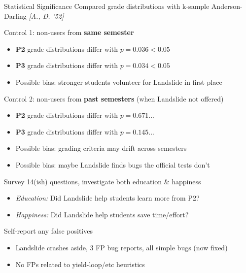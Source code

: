 \documentclass[xcolor=dvipsnames]{beamer}
\begin{document}
\begin{frame}{Statistical Significance}
	Compared %
	grade distributions with k-sample Anderson-Darling {\em [A., D. '52]}
	\linegap

	Control 1: non-users from {\bf same semester}
	\begin{itemize}
		\item {\bf P2} grade distributions differ with $p = 0.036 < 0.05$
		\item {\bf P3} grade distributions differ with $p = 0.034 < 0.05$
			\pause
		\item Possible bias: stronger students volunteer for Landslide in first place
	\end{itemize}
	\pause
	\linegap

	Control 2: non-users from {\bf past semesters} (when Landslide not offered)
	\begin{itemize}
		\item {\bf P2} grade distributions differ with $p = 0.671$...
		\item {\bf P3} grade distributions differ with $p = 0.145$...
			\pause
		\item Possible bias: grading criteria may drift across semesters
		\item Possible bias: maybe Landslide finds bugs the official tests don't
	\end{itemize}
\end{frame}

\begin{frame}{Survey}
	14(ish) questions, investigate both education \& happiness
	\begin{itemize}
		\item {\em Education:} Did Landslide help students learn more from P2?
		\item {\em Happiness:} Did Landslide help students save time/effort?
	\end{itemize}
	\linegap

	Self-report any false positives
	\begin{itemize}
		\item Landslide crashes aside, 3 FP bug reports, all simple bugs (now fixed)
		\item No FPs related to yield-loop/etc heuristics
	\end{itemize}
\end{frame}
\end{document}
